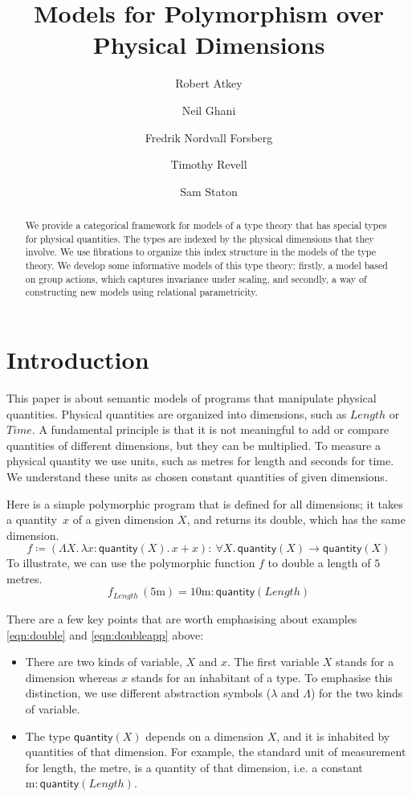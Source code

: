 \documentclass[a4paper,UKenglish]{lipics}
\title{Models for Polymorphism over Physical Dimensions}
\author[1]{Robert Atkey}
\author[1]{Neil Ghani}
\author[1]{Fredrik Nordvall Forsberg}
\author[1]{Timothy Revell}
\author[2]{Sam Staton}
\affil[1]{University of Strathclyde}
\affil[2]{University of Oxford}
\theoremstyle{plain}
\newcommand{\msf}[1]{\mathsf{#1}} %
\newcommand{\qnt}{\msf{quantity}}
\newcommand{\lengthDim}{\mathit{Length}}
\newcommand{\timeDim}{\mathit{Time}}
\newcommand{\Dvar}{X}
\begin{document}
\maketitle

\begin{abstract}
We provide a categorical framework for models of a type theory that has special types for physical quantities. The types are indexed by the physical dimensions that they involve. We use fibrations to organize this index structure in the models of the type theory. We develop some informative models of this type theory: firstly, a model based on group actions, which captures invariance under scaling, and secondly, a way of constructing new models using relational parametricity.
\end{abstract}

\section{Introduction}
This paper is about semantic models of programs that manipulate physical quantities. Physical quantities are organized into dimensions, such as $\lengthDim$ or $\timeDim$. A fundamental principle is that it is not meaningful to add or compare quantities of different dimensions, but they can be multiplied. 
%
To measure a physical quantity we use units, such as metres for length and seconds for time. We understand these units as chosen constant quantities of given dimensions.

Here is a simple polymorphic program that is defined for all dimensions; it takes a quantity~$x$ of a given dimension $X$, and returns its double, which has the same dimension.
\begin{equation}
f\coloneqq (\Lambda X.\,\lambda x:\qnt(X).\,x+x)
:\ \forall X.\,\qnt(X)\to \qnt(X)
\label{eqn:double}
\end{equation}
To illustrate, we can use the polymorphic function $f$ to double a length of $5$ metres.
\begin{equation}
f_\lengthDim\,(5\mathrm{m})=
10\mathrm{m}:\qnt(\lengthDim)
\label{eqn:doubleapp}
\end{equation}

\noindent There are a few key points that are worth emphasising about examples \eqref{eqn:double} and \eqref{eqn:doubleapp} above:
\begin{itemize}
\item There are two kinds of variable, $\Dvar$ and $x$. The first variable $\Dvar$ stands for a dimension whereas $x$ stands for an inhabitant of a type. To emphasise this distinction, we use different abstraction symbols ($\lambda$ and $\Lambda$) for the two kinds of variable.
\item The type $\qnt(\Dvar)$ depends on a dimension $\Dvar$, and it is inhabited by quantities of that dimension. For example, the standard unit of measurement for length, the metre, is a quantity of that dimension, i.e. a constant $\mathrm m:\qnt(\lengthDim)$.
\end{itemize}
\end{document}
